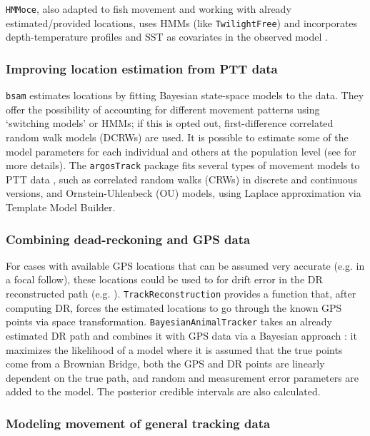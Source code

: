 \documentclass[a4paper,12pt]{article}
\newcommand{\Rpkg}[1]{\texttt{#1}}
\begin{document}
	\Rpkg{HMMoce}, also adapted to fish movement and working with already estimated/provided locations, uses HMMs (like \Rpkg{TwilightFree}) and incorporates depth-temperature profiles and SST as covariates in the observed model \citep{Braun2017}. 
	
	\subsubsection*{Improving location estimation from PTT data}
	
	\Rpkg{bsam} estimates locations by fitting Bayesian state-space models to the data. They offer the possibility of accounting for different movement patterns using `switching models' or HMMs; if this is opted out, first-difference correlated random walk models (DCRWs) are used. It is possible to estimate some of the model parameters for each individual and others at the population level (see \cite{Jonsen2013,Jonsen2016} for more details). The \Rpkg{argosTrack} package fits several types of movement models to PTT data \citep{Albertsen2015}, such as correlated random walks (CRWs) in discrete and continuous versions, and Ornstein-Uhlenbeck (OU) models, using Laplace approximation via Template Model Builder. 
	
	\subsubsection*{Combining dead-reckoning and GPS data}
	
	For cases with available GPS locations that can be assumed very accurate (e.g. in a focal follow), these locations could be used to for drift error in the DR reconstructed path (e.g. \cite{dewhirst2016improving,Liu2016}).
	\Rpkg{TrackReconstruction} provides a function that, after computing DR, forces the estimated locations to go through the known GPS points via space transformation. \Rpkg{BayesianAnimalTracker} takes an already estimated DR path and combines it with GPS data via a Bayesian approach \citep{Liu2016}: it maximizes the likelihood of a model where it is assumed that the true points come from a Brownian Bridge, both the GPS and DR points are linearly dependent on the true path, and random and measurement error parameters are added to the model. The posterior credible intervals are also calculated. 
	
	
	\subsubsection*{Modeling movement of general tracking data}
	
\end{document}
